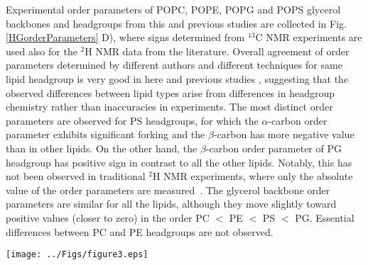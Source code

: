 \documentclass[aps,prl,superscriptaddress,twocolumn]{revtex4}
\begin{document}
Experimental order parameters of POPC, POPE, POPG and POPS glycerol backbones and
headgroups from this and previous studies are collected in Fig. \ref{HGorderParameters} D),
where signs determined from $^{13}$C NMR experiments are used also for the $^2$H NMR data from the literature.
Overall agreement of order parameters determined by different authors and different techniques
for same lipid headgroup is very good in here and previous studies \cite{botan15,ollila16,antila19},
suggesting that the observed differences between lipid types arise from differences in
headgroup chemistry rather than inaccuracies in experiments. 
The most distinct order parameters are observed for PS headgroups,
for which the $\alpha$-carbon order parameter exhibits significant forking
and the $\beta$-carbon has more negative value than in other lipids.
On the other hand, the $\beta$-carbon order parameter of PG headgroup
has positive sign in contrast to all the other lipids.
Notably, this has not been observed in traditional $^2$H NMR experiments,
where only the absolute value of the order parameters are measured~\cite{wohlgemuth80,gally81,borle85}.
The glycerol backbone order parameters are similar for all the lipids, although they move slightly toward
positive values (closer to zero) in the order PC $<$ PE $<$ PS $<$ PG.
Essential differences between PC and PE headgroups are not observed.


\begin{figure*}[bt]
  \centering
  \texttt{[image: ../Figs/figure3.eps]}
  \caption{\label{changesWITHsurf}
    {\bf A)} Modulation of PC headgroup order parameters and P-N vector angle upon addition of cationic surfactant
    from CHARMM36 simulations compared with experimental data \cite{??}.
    {\bf B)} Changes in PC headgroup conformational ensembles upon increasing amount of positive charge in bilayer,
    characterized by the heavy atom dihedral distributions, from CHARMM36 simulations.
  }
\end{figure*}
\end{document}
